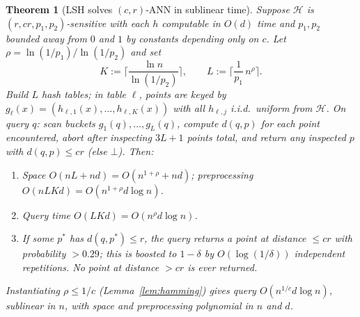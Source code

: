 \documentclass{amsart}
\newtheorem{theorem}{Theorem}
\begin{document}
\begin{theorem}[LSH solves $(c,r)$-ANN in sublinear time]\label{thm:lsh}
Suppose $\mathcal H$ is $(r,cr,p_1,p_2)$-sensitive with each $h$ computable in $O(d)$
time and $p_1,p_2$ bounded away from $0$ and $1$ by constants depending only on $c$.
Let $\rho=\ln(1/p_1)/\ln(1/p_2)$ and set
\[
K:=\Big\lceil \frac{\ln n}{\ln(1/p_2)}\Big\rceil,
\qquad
L:=\Big\lceil \frac{1}{p_1}\,n^{\rho}\Big\rceil .
\]
Build $L$ hash tables; in table $\ell$, points are keyed by
$g_\ell(x)=(h_{\ell,1}(x),\dots,h_{\ell,K}(x))$ with all $h_{\ell,j}$ i.i.d.\ uniform
from $\mathcal H$.  On query $q$: scan buckets $g_1(q),\dots,g_L(q)$, compute $d(q,p)$
for each point encountered, abort after inspecting $3L+1$ points total, and return any
inspected $p$ with $d(q,p)\le cr$ (else $\bot$).  Then:
\begin{enumerate}
\item[(a)] Space $O(nL+nd)=O(n^{1+\rho}+nd)$; preprocessing $O(nLKd)=
O(n^{1+\rho}d\log n)$.
\item[(b)] Query time $O(LKd)=O(n^{\rho}d\log n)$.
\item[(c)] If some $p^\ast$ has $d(q,p^\ast)\le r$, the query returns a point at
distance $\le cr$ with probability $>0.29$; this is boosted to $1-\delta$ by
$O(\log(1/\delta))$ independent repetitions.  No point at distance $>cr$ is ever
returned.
\end{enumerate}
Instantiating $\rho\le 1/c$ (Lemma~\ref{lem:hamming}) gives query $O(n^{1/c}d\log n)$,
sublinear in $n$, with space and preprocessing polynomial in $n$ and $d$.
\end{theorem}
\end{document}

